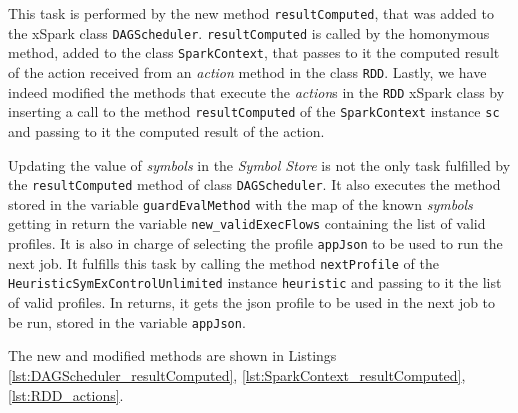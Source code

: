 This task is performed by the new method \texttt{resultComputed}, that was added to the xSpark class \texttt{DAGScheduler}. \texttt{resultComputed} is called by the homonymous method, added to the class \texttt{SparkContext}, that passes to it the computed result of the action received from an \textit{action} method in the class \texttt{RDD}. 
Lastly, we have indeed modified the methods that execute the \textit{action}s in the \texttt{RDD} xSpark class by inserting a call to the method \texttt{resultComputed} of the \texttt{SparkContext} instance \texttt{sc} and passing to it the computed result of the action. 

Updating the value of \textit{symbols} in the \textit{Symbol Store} is not the only task fulfilled by the \texttt{resultComputed} method of class \texttt{DAGScheduler}. It also executes the method stored in the variable \texttt{guardEvalMethod} with the map of the known \textit{symbols} getting in return the variable \texttt{new\_validExecFlows} containing the list of valid profiles. It is also in charge of selecting the profile \texttt{appJson} to be used to run the next job. It fulfills this task by calling the method \texttt{nextProfile} of the \texttt{HeuristicSymExControlUnlimited} instance \texttt{heuristic} and passing to it the list of valid profiles. In returns, it gets the json profile to be used in the next job to be run, stored in the variable \texttt{appJson}. 

The new and modified methods are shown in Listings \ref{lst:DAGScheduler_resultComputed}, \ref{lst:SparkContext_resultComputed}, \ref{lst:RDD_actions}.





